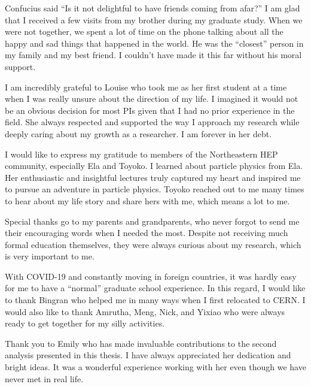\begin{acknowledgments}

Confucius said ``Is it not delightful to have friends coming from afar?'' I am glad that I received a few visits from my brother during my graduate study. When we were not together, we spent a lot of time on the phone talking about all the happy and sad things that happened in the world. He was the ``closest'' person in my family and my best friend. I couldn’t have made it this far without his moral support.

I am incredibly grateful to Louise who took me as her first student at a time when I was really unsure about the direction of my life. I imagined it would not be an obvious decision for most PIs given that I had no prior experience in the field. She always respected and supported the way I approach my research while deeply caring about my growth as a researcher. I am forever in her debt.  

I would like to express my gratitude to members of the Northeastern HEP community, especially Ela and Toyoko. I learned about particle physics from Ela. Her enthusiastic and insightful lectures truly captured my heart and inspired me to pursue an adventure in particle physics. Toyoko reached out to me many times to hear about my life story and share hers with me, which means a lot to me.

Special thanks go to my parents and grandparents, who never forgot to send me their encouraging words when I needed the most. Despite not receiving much formal education themselves, they were always curious about my research, which is very important to me.

With COVID-19 and constantly moving in foreign countries, it was hardly easy for me to have a ``normal'' graduate school experience. In this regard, I would like to thank Bingran who helped me in many ways when I first relocated to CERN. I would also like to thank Amrutha, Meng, Nick, and Yixiao who were always ready to get together for my silly activities. 

Thank you to Emily who has made invaluable contributions to the second analysis presented in this thesis. I have always appreciated her dedication and bright ideas. It was a wonderful experience working with her even though we have never met in real life.

\end{acknowledgments}